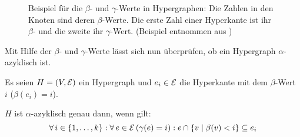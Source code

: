 \begin{figure}[htbp]
%
%        
%        
% 
%        
%  
%            
%  
%  
%        
%  
%        
    \hspace*{\fill}
    \caption[Beispiel für die $\beta$- und $\gamma$-Werte in Hypergraphen]{Beispiel für die $\beta$- und $\gamma$-Werte in Hypergraphen: Die Zahlen in den Knoten sind deren $\beta$-Werte. Die erste Zahl einer Hyperkante ist ihr $\beta$- und die zweite ihr $\gamma$-Wert. (Beispiel entnommen aus \cite{LinearTimeAcylicityTest})}
    \label{pic:Bsp_HypergraphGamaBeta}
\end{figure}


Mit Hilfe der $\beta$- und $\gamma$-Werte lässt sich nun überprüfen, ob ein Hypergraph $\alpha$-azyklisch ist.

\begin{Theorem} \label{theo:AcyclicityTest} \cite{LinearTimeAcylicityTest}
     Es seien $H=(V,\mathcal{E})$ ein Hypergraph und $e_i \in \mathcal{E}$ die Hyperkante mit dem $\beta$-Wert $i$ ($\beta(e_i) = i$).
    
    $H$ ist $\alpha$-azyklisch genau dann, wenn gilt:
    \[ \forall\,i \in \{1, \ldots, k\}: \forall\, e \in \mathcal{E}\, (\gamma(e)=i):e\cap \{v \mid \beta(v) < i \} \subseteq e_i \]
\end{Theorem}

